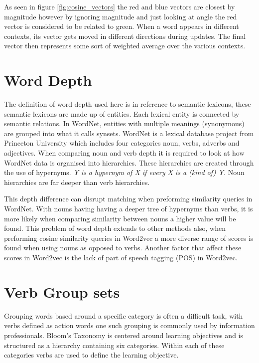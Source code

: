 \noindent
As seen in figure \ref{fig:cosine_vectors} the red and blue vectors are closest by magnitude however by ignoring magnitude and just looking at angle the red vector is considered to be related to green. When a word appears in different contexts, its vector gets moved in different directions during updates. The final vector then represents some sort of weighted average over the various contexts. 

\section{Word Depth} 
The definition of word depth used here is in reference to semantic lexicons, these semantic lexicons are made up of entities. Each lexical entity is connected by semantic relations. In WordNet, entities with multiple meanings (synonymous) are grouped into what it calls synsets. WordNet is a lexical database project from Princeton University which includes four categories noun, verbs, adverbs and adjectives. When comparing noun and verb depth it is required to look at how WordNet data is organised into hierarchies. These hierarchies are created through the use of hypernyms. \textit{Y is a hypernym of X if every X is a (kind of) Y.} Noun hierarchies are far deeper than verb hierarchies.

This depth difference can disrupt matching when preforming similarity queries in WordNet. With nouns having having a deeper tree of hypernyms than verbs, it is more likely when comparing similarity between nouns a higher value will be found. This problem of word depth extends to other methods also, when preforming cosine similarity queries in Word2vec a more diverse range of scores is found when using nouns as opposed to verbs. Another factor that affect these scores in Word2vec is the lack of part of speech tagging (POS) in Word2vec.

\section{Verb Group sets}
Grouping words based around a specific category is often a difficult task, with verbs defined as action words one such grouping is commonly used by information professionals. Bloom's Taxonomy is centered around learning objectives and is structured as a hierarchy containing six categories. Within each of these categories verbs are used to define the learning objective.

